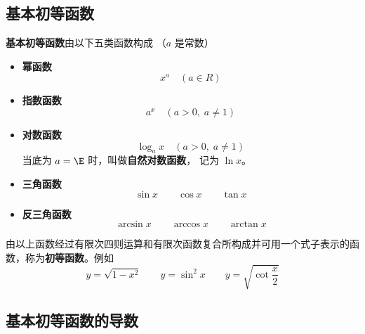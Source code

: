 

\subsection{基本初等函数}
\textbf{基本初等函数}由以下五类函数构成 （$a$ 是常数）

\begin{itemize}
\item \textbf{幂函数}
\begin{equation}\label{FunDer_eq3}
x^a \quad(a \in R)
\end{equation}
\item \textbf{指数函数}
\begin{equation}
a^x \quad(a > 0, \; a \ne 1)
\end{equation}
\item \textbf{对数函数}
\begin{equation}
\log_a x \quad(a > 0, \; a \ne 1)
\end{equation}
当底为 $a = \E$ 时，叫做\textbf{自然对数函数}， 记为 $\ln x$。
\item \textbf{三角函数}
\begin{equation}
\sin x \qquad  \cos x \qquad \tan x
\end{equation}
\item \textbf{反三角函数}
\begin{equation}
\arcsin x  \qquad \arccos x  \qquad \arctan x
\end{equation}
\end{itemize}

由以上函数经过有限次四则运算和有限次函数复合所构成并可用一个式子表示的函数，称为\textbf{初等函数}。例如
\begin{equation}
y = \sqrt{1 - x^2}\qquad y = \sin ^2 x\qquad y = \sqrt{\cot \frac{x}{2}} 
\end{equation}

\subsection{基本初等函数的导数}

